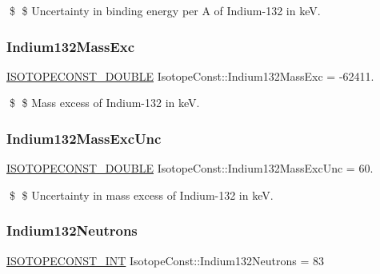 \$ \$ Uncertainty in binding energy per A of Indium-\/132 in keV. \mbox{\label{group___isotope_const-_indium-_in132_gae1a23921e3550a0b0782879ea6fe4ea1}} 
\subsubsection{\texorpdfstring{Indium132\+Mass\+Exc}{Indium132MassExc}}
{\footnotesize\ttfamily \mbox{\hyperlink{group___isotope_const-_macros_ga8f45a7272ce02c0b4c65c44636ed719a}{I\+S\+O\+T\+O\+P\+E\+C\+O\+N\+S\+T\+\_\+\+D\+O\+U\+B\+LE}} Isotope\+Const\+::\+Indium132\+Mass\+Exc = -\/62411.}

\$ \$ Mass excess of Indium-\/132 in keV. \mbox{\label{group___isotope_const-_indium-_in132_gaa685bce664bf12c800e9625cbbbbed6d}} 
\subsubsection{\texorpdfstring{Indium132\+Mass\+Exc\+Unc}{Indium132MassExcUnc}}
{\footnotesize\ttfamily \mbox{\hyperlink{group___isotope_const-_macros_ga8f45a7272ce02c0b4c65c44636ed719a}{I\+S\+O\+T\+O\+P\+E\+C\+O\+N\+S\+T\+\_\+\+D\+O\+U\+B\+LE}} Isotope\+Const\+::\+Indium132\+Mass\+Exc\+Unc = 60.}

\$ \$ Uncertainty in mass excess of Indium-\/132 in keV. \mbox{\label{group___isotope_const-_indium-_in132_gab0e6d66dd4fb6fb0714454a91f8fdb1f}} 
\subsubsection{\texorpdfstring{Indium132\+Neutrons}{Indium132Neutrons}}
{\footnotesize\ttfamily \mbox{\hyperlink{group___isotope_const-_macros_ga5f18360b3e99483a35c32d789e62621c}{I\+S\+O\+T\+O\+P\+E\+C\+O\+N\+S\+T\+\_\+\+I\+NT}} Isotope\+Const\+::\+Indium132\+Neutrons = 83}

